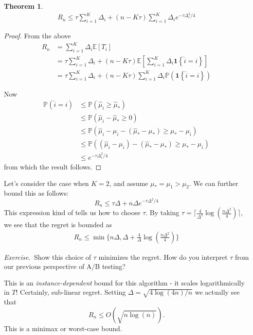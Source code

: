 \documentclass[11pt]{article}
\newtheorem{theorem}{Theorem}
\newcommand{\exercise}{\noindent\textit{Exercise.\  }}
\renewcommand{\P}{\mathbb{P}}
\newcommand{\E}{\mathbb{E}}
\newcommand{\1}[1]{\mathbf{1}\left\{#1\right\}}
\begin{document}
\begin{theorem}
      \begin{align*}
        R_n \leq  \tau\sum_{i=1}^K \Delta_i + (n-K\tau)\sum_{i=1}^K \Delta_i e^{-\tau\Delta_i^2/4}
      \end{align*}
\end{theorem}
\begin{proof}
    From the above
    \begin{align*}
        R_n 
        &= \sum_{i=1}^K \Delta_i \E[T_i]\\
        &= \tau\sum_{i=1}^K \Delta_i + (n-K\tau)\E\left[\sum_{i=1}^K \Delta_i\1{\hat{i}=i}\right]\\
        &= \tau\sum_{i=1}^K \Delta_i + (n-K\tau)\sum_{i=1}^K \Delta_i\P(\1{\hat{i}=i})
    \end{align*}

Now
\begin{align*}
    \P(\hat{i} = i)
    &\leq \P(\hat{\mu}_{i} \geq \hat{\mu}_{\ast})\\
    &\leq \P(\hat{\mu}_{i}  - \hat{\mu}_{\ast} \geq 0)\\
    &\leq \P(\hat{\mu}_{i} - \mu_i  - (\hat{\mu}_{\ast}-\mu_{\ast}) \geq \mu_{\ast} - \mu_i)\\
    &\leq \P((\hat{\mu}_{i} - \mu_i)  - (\hat{\mu}_{\ast}-\mu_{\ast}) \geq \mu_{\ast} - \mu_i)\tag{This is $2/\tau$-subGaussian}\\
    &\leq e^{-\tau\Delta_i^2/4}
\end{align*}
from which the result follows.
\end{proof}

Let's consider the case when $K=2$, and assume $\mu_{\ast} = \mu_1 > \mu_2$. We can further bound this as follows:
\[R_n \leq \tau \Delta + n\Delta e^{-\tau\Delta^2/4}\]
This expression kind of tells us how to choose $\tau$.  By taking $\tau =\lceil \frac{4}{\Delta^2} \log\left(\frac{n\Delta^2}{4}\right)\rceil$, we see that the regret is bounded as
\begin{align*}
    R_n \leq \min\{n\Delta,  \Delta + \frac{4}{\Delta}\log\left(\frac{n\Delta^2}{4}\right)\}
\end{align*}

\exercise Show this choice of $\tau$ minimizes the regret. How do you interpret $\tau$ from our previous perspective of A/B testing?

This is an \textit{instance-dependent} bound for this algorithm - it scales logarithmically in $T$! Certainly, sub-linear regret. Setting $\Delta = \sqrt{4\log(4n)/n}$ we actually see that
\[R_n \leq O(\sqrt{n\log(n)}).\]
 This is a minimax or worst-case bound.
\end{document}
